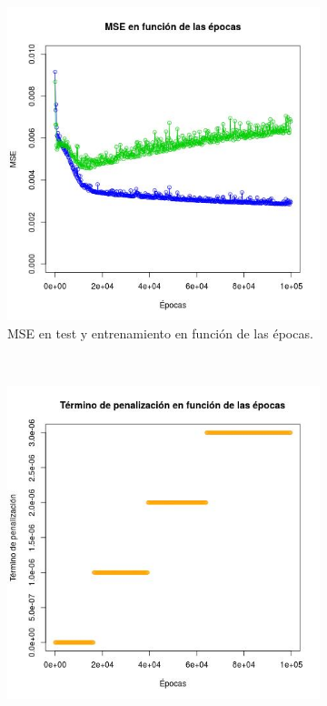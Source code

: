 \documentclass[12pt, a4paper]{article}
\begin{document}
 \begin{figure}
    \centering

    \begin{subfigure}[b]{0.45\textwidth}
        \includegraphics[width=\textwidth]{ejercicioD1}
		\caption{MSE en test y entrenamiento en función de las épocas.}
    \end{subfigure}
      ~ %
    \begin{subfigure}[b]{0.45\textwidth}
        \includegraphics[width=\textwidth]{penalizacion1}

\end{subfigure}
\end{figure}
\end{document}
